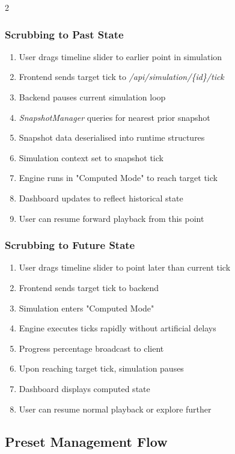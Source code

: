 \begin{multicols}{2}
\subsubsection*{Scrubbing to Past State}
\begin{enumerate}
    \item User drags timeline slider to earlier point in simulation
    \item Frontend sends target tick to \textit{/api\allowbreak/simulation\allowbreak/\{id\}\allowbreak/tick}
    \item Backend pauses current simulation loop
    \item \textit{SnapshotManager} queries for nearest prior snapshot
    \item Snapshot data deserialised into runtime structures
    \item Simulation context set to snapshot tick
    \item Engine runs in "Computed Mode" to reach target tick
    \item Dashboard updates to reflect historical state
    \item User can resume forward playback from this point
\end{enumerate}

\subsubsection*{Scrubbing to Future State}
\begin{enumerate}
    \item User drags timeline slider to point later than current tick
    \item Frontend sends target tick to backend
    \item Simulation enters "Computed Mode"
    \item Engine executes ticks rapidly without artificial delays
    \item Progress percentage broadcast to client
    \item Upon reaching target tick, simulation pauses
    \item Dashboard displays computed state
    \item User can resume normal playback or explore further
\end{enumerate}

\subsection{Preset Management Flow}


\end{multicols}
